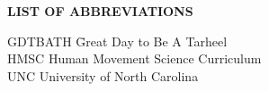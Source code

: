 
{}

\begin{center}
{\normalfont \textbf{LIST OF ABBREVIATIONS}}
\end{center}

\newcommand{\Ab}[2]{\noindent  #1 \> #2 \\}
\newcommand{\Abi}[2]{\noindent #1 \hspace{1.5cm} \= #2 \\}

\begin{tabbing}
\Abi{GDTBATH}{Great Day to Be A Tarheel}
\Ab{HMSC}{Human Movement Science Curriculum}
\Ab{UNC}{University of North Carolina}
\end{tabbing}

\clearpage
